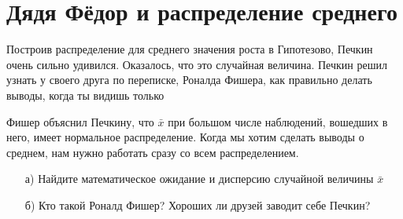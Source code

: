 \documentclass[12pt, a4paper, oneside]{article}
\begin{document}
\section{Дядя Фёдор и распределение среднего}

Построив распределение для среднего значения роста в Гипотезово, Печкин очень сильно удивился. Оказалось, что это случайная величина. Печкин решил узнать у своего друга по переписке, Роналда Фишера, как правильно делать выводы, когда ты видишь только 

Фишер объяснил Печкину, что $\bar x$ при большом числе наблюдений, вошедших в него, имеет нормальное распределение. Когда мы хотим сделать выводы о среднем, нам нужно работать сразу со всем распределением. 

\begin{enumerate}
    \item[а)] Найдите математическое ожидание и дисперсию случайной величины $\bar{x}$
	\item[б)] Кто такой Роналд Фишер? Хороших ли друзей заводит себе Печкин?
\end{enumerate}
\end{document}
